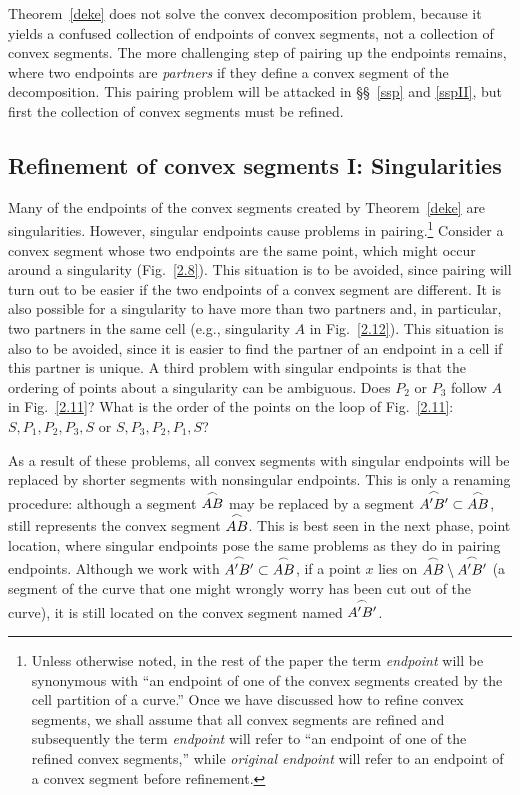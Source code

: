 Theorem~\ref{deke} does not solve the convex decomposition problem,
because it yields a confused collection of endpoints of convex segments, 
not a collection of convex segments.
The more challenging step of pairing up the endpoints remains, where
two endpoints are {\em partners} if they define a convex segment of the 
decomposition.
This pairing problem will be attacked in \S\S~\ref{ssp} 
and \ref{sspII}, but first the collection of convex segments must be 
refined.

\subsection{Refinement of convex segments I: Singularities}
\label{sec-refine1}

Many of the endpoints of the convex segments created by Theorem~\ref{deke} 
are singularities.  However, singular endpoints
cause problems in pairing.\footnote{Unless otherwise noted, in the rest of the paper
	the term {\em endpoint} will be synonymous with 
	``an endpoint of one of 
	the convex segments created by the cell partition of a curve.''
	Once we have discussed how to refine convex segments, we shall
	assume that all convex segments are refined and subsequently
	the term {\em endpoint} will refer to 
	``an endpoint of one of the refined convex segments,'' while
	{\em original endpoint} will refer to
	an endpoint of a convex segment before refinement.}
Consider a convex segment whose two endpoints are the same point,
which might occur around a singularity (Fig.~\ref{2.8}).
This situation is to be avoided, since pairing will turn out to be easier if 
the two endpoints of a convex segment are different.
It is also possible for a singularity to have more than two
partners and, in particular, two partners in the same cell (e.g., singularity 
$A$ in Fig.~\ref{2.12}).
This situation is also to be avoided, since it is easier to find the partner 
of an endpoint in a cell if this partner is unique.
A third problem with singular endpoints is that the ordering of points about
a singularity can be ambiguous.
Does $P_{2}$ or $P_{3}$ follow $A$ in Fig.~\ref{2.11}?
What is the order of the points on the loop of Fig.~\ref{2.11}: 
$S, P_{1}, P_{2}, P_{3}, S$ or $S, P_{3}, P_{2}, P_{1}, S$?


As a result of these problems, all convex segments with singular endpoints 
will be replaced by shorter segments with nonsingular endpoints.
This is only a renaming procedure: although a segment $\mbox{$\stackrel{\frown}{AB}$}$ may be replaced
by a segment $\mbox{$\stackrel{\frown}{A'B'}$} \subset \mbox{$\stackrel{\frown}{AB}$}$,
 still represents the convex segment $\mbox{$\stackrel{\frown}{AB}$}$.
This is best seen in the next phase, point location,
where singular endpoints pose the same problems as they
do in pairing endpoints.
Although we work with $\mbox{$\stackrel{\frown}{A'B'}$} \subset \mbox{$\stackrel{\frown}{AB}$}$, if a point $x$ lies 
on $\mbox{$\stackrel{\frown}{AB}$} \setminus \mbox{$\stackrel{\frown}{A'B'}$}$ (a segment of the curve that
one might wrongly worry has been cut out of the curve),
it is still located on the convex segment named $\mbox{$\stackrel{\frown}{A'B'}$}$.

